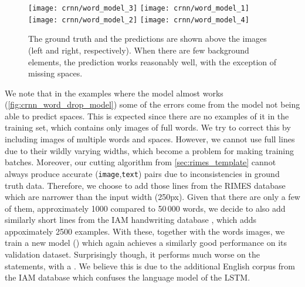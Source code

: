			\begin{figure}
				\texttt{[image: crnn/word\_model\_3]}
				\texttt{[image: crnn/word\_model\_1]}
				\texttt{[image: crnn/word\_model\_2]}
				\texttt{[image: crnn/word\_model\_4]}
				\caption[Predictions of  model]{The ground truth and the predictions are shown above the images (left and right, respectively). When there are few background elements, the prediction works reasonably well, with the exception of missing spaces.}
				\label{fig:crnn_word_drop_model}
			\end{figure}

			We note that in the examples where the model almost works (\autoref{fig:crnn_word_drop_model}) some of the errors come from the model not being able to predict spaces. This is expected since there are no examples of it in the training set, which contains only images of full words. We try to correct this by including images of multiple words and spaces. However, we cannot use full lines due to their wildly varying widths, which become a problem for making training batches. Moreover, our cutting algorithm from \autoref{sec:rimes_template} cannot always produce accurate (\texttt{image},\texttt{text}) pairs due to inconsistencies in ground truth data. Therefore, we choose to add those lines from the RIMES database which are narrower than the input width (250px). Given that there are only a few of them, approximately 1000 compared to 50\,000 words, we decide to also add similarly short lines from the IAM handwriting database \citep{iam}, which adds appoximately 2500 examples. With these, together with the words images, we train a new model () which again achieves a similarly good performance on its validation dataset. Surprisingly though, it performs much worse on the statements, with a . We believe this is due to the additional English corpus from the IAM database which confuses the language model of the LSTM.

